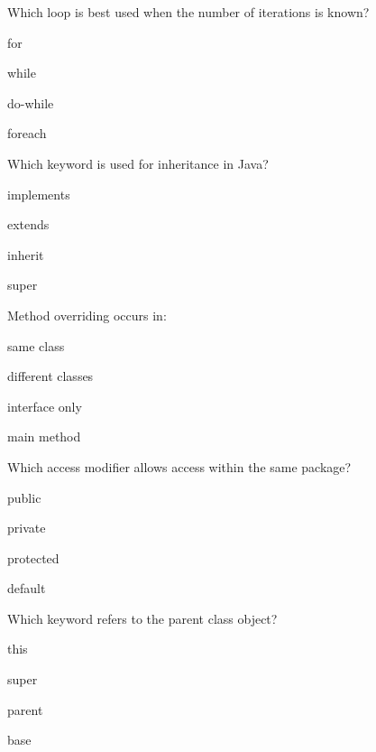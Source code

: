 \documentclass{USTBExam}
\begin{document}
\begin{question}
Which loop is best used when the number of iterations is known?
\paren
\begin{choices}
\item for
\item while
\item do-while
\item foreach
\end{choices}
\end{question}

\begin{question}
Which keyword is used for inheritance in Java?
\paren
\begin{choices}
\item implements
\item extends
\item inherit
\item super
\end{choices}
\end{question}

\begin{question}
Method overriding occurs in:
\paren
\begin{choices}
\item same class
\item different classes
\item interface only
\item main method
\end{choices}
\end{question}

\begin{question}
Which access modifier allows access within the same package?
\paren
\begin{choices}
\item public
\item private
\item protected
\item default
\end{choices}
\end{question}

\begin{question}
Which keyword refers to the parent class object?
\paren
\begin{choices}
\item this
\item super
\item parent
\item base
\end{choices}
\end{question}
\end{document}
